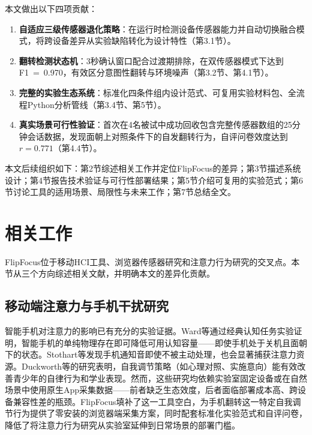 \documentclass[12pt,a4paper]{ctexart}
\begin{document}
本文做出以下四项贡献：
\begin{enumerate}[leftmargin=*,label=\textbf{C\arabic*：}]
    \item \textbf{自适应三级传感器退化策略}：在运行时检测设备传感器能力并自动切换融合模式，将跨设备差异从实验缺陷转化为设计特性（第3.1节）。
    \item \textbf{翻转检测状态机}：3秒确认窗口配合过渡期排除，在双传感器模式下达到F1~=~0.970，有效区分意图性翻转与环境噪声（第3.2节、第4.1节）。
    \item \textbf{完整的实验生态系统}：标准化四条件组内设计范式、可复用实验材料包、全流程Python分析管线（第3.4节、第5节）。
    \item \textbf{真实场景可行性验证}：首次在4名被试中成功回收包含完整传感器数组的25分钟会话数据，发现面朝上对照条件下的自发翻转行为，自评问卷效度达到$r=0.771$（第4.4节）。
\end{enumerate}
本文后续组织如下：第2节综述相关工作并定位FlipFocus的差异；第3节描述系统设计；第4节报告技术验证与可行性部署结果；第5节介绍可复用的实验范式；第6节讨论工具的适用场景、局限性与未来工作；第7节总结全文。

\section{相关工作}

FlipFocus位于移动HCI工具、浏览器传感器研究和注意力行为研究的交叉点。本节从三个方向综述相关文献，并明确本文的差异化贡献。

\subsection{移动端注意力与手机干扰研究}

智能手机对注意力的影响已有充分的实验证据。Ward等\cite{ward2017brain}通过经典认知任务实验证明，智能手机的单纯物理存在即可降低可用认知容量——即使手机处于关机且面朝下的状态。Stothart等\cite{stothart2015attentional}发现手机通知音即使不被主动处理，也会显著捕获注意力资源。Duckworth等\cite{duckworth2011self}的研究表明，自我调节策略（如心理对照、实施意向）能有效改善青少年的自律行为和学业表现。然而，这些研究均依赖实验室固定设备或在自然场景中使用原生App采集数据——前者缺乏生态效度，后者面临部署成本高、跨设备兼容性差的瓶颈。FlipFocus填补了这一工具空白，为手机翻转这一特定自我调节行为提供了零安装的浏览器端采集方案，同时配套标准化实验范式和自评问卷，降低了将注意力行为研究从实验室延伸到日常场景的部署门槛。
\end{document}
